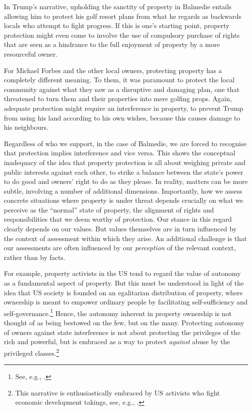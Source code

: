 In Trump's narrative, upholding the sanctity of property in Balmedie entails allowing him to protect his golf resort plans from what he regards as backwards locals who attempt to fight progress. If this is one's starting point, property protection might even come to involve the use of compulsory purchase of rights that are seen as a hindrance to the full enjoyment of property by a more resourceful owner. 

For Michael Forbes and the other local owners, protecting property has a completely different meaning. To them, it was paramount to protect the local community against what they saw as a disruptive and damaging plan, one that threatened to turn them and their properties into mere golfing props. Again, adequate protection might require an interference in property, to prevent Trump from using his land according to his own wishes, because this causes damage to his neighbours. 

Regardless of who we support, in the case of Balmedie, we are forced to recognise that protection implies interference and vice versa. This shows the conceptual inadequacy of the idea that property protection is all about weighing private and public interests against each other, to strike a balance between the state's power to do good and owners' right to do as they please. In reality, matters can be more subtle, involving a number of additional dimensions. Importantly, how we assess concrete situations where property is under threat depends crucially on what we perceive as the ``normal'' state of property, the alignment of rights and responsibilities that we deem  worthy of protection. Our stance in this regard clearly depends on our values. But values themselves are in turn influenced by the context of assessment within which they arise. An additional challenge is that our assessments are often influenced by our \emph{perception} of the relevant context, rather than by facts.

For example, property activists in the US tend to regard the value of autonomy as a fundamental aspect of property. But this must be understood in light of the idea that US society is founded on an egalitarian distribution of property, where ownership is meant to empower ordinary people by facilitating self-sufficiency and self-governance.\footnote{See, e.g., \cite[173]{ely07}.} Hence, the autonomy inherent in property ownership is not thought of as being bestowed on the few, but on the many. Protecting autonomy of owners against state interference is not about protecting the privileges of the rich and powerful, but is embraced as a way to protect {\it against} abuse by the privileged classes.\footnote{This narrative is enthusiastically embraced by US activists who fight economic development takings, see, e.g., \cite{castle15}.} 

